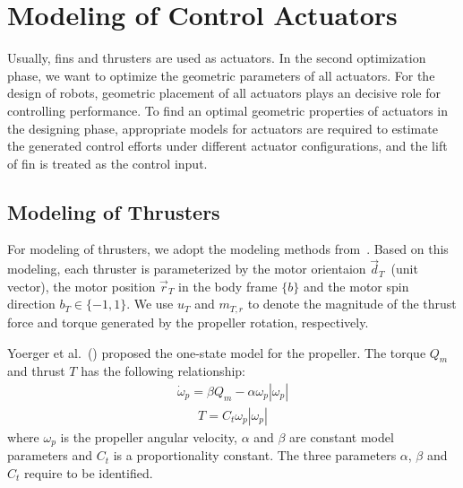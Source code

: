 \section{Modeling of Control Actuators}
Usually, fins and thrusters are used as actuators. In the second optimization phase, we want to optimize the geometric parameters of all actuators. For the design of robots, geometric placement of all  actuators plays an decisive role for controlling performance. To find an optimal geometric properties of actuators in the designing phase, appropriate models for actuators are required to estimate the generated control efforts under different actuator configurations, and the lift of fin is treated as the control input.  
 
\subsection{Modeling of Thrusters}
\label{Subsection:ModelingofThrusters}
For modeling of thrusters, we adopt the modeling methods from~\cite{Du2016}. 
Based on this modeling, each thruster is parameterized by the motor orientaion $\vec{d}_{T}$~(unit vector), the motor position $\vec{r}_{T}$ in the body frame $\lbrace b \rbrace$ and the motor spin direction  $b_{T}\in \lbrace-1,1\rbrace$. We use $u_{T}$ and $m_{T,r}$ to denote the magnitude of the thrust force and torque generated by the propeller rotation, respectively.

Yoerger et al.~(\cite{PropellerModel}) proposed the one-state model for the propeller.
The torque $Q_{m}$ and thrust $T$ has the following relationship:
\begin{align}
\dot{\omega}_{p}=\beta Q_{m}-\alpha\omega_{p}|\omega_{p}|
\label{EQ:PropellerDynamics1}
\end{align}
\begin{align}
T=C_{t}\omega_{p}|\omega_{p}|
\label{EQ:PropellerDynamics2}
\end{align}
where $\omega_{p}$ is the propeller angular velocity, $\alpha$ and $\beta$ are constant model parameters and $C_{t}$ is a proportionality constant. The three parameters $\alpha$, $\beta$ and $C_{t}$ require to be identified. 

